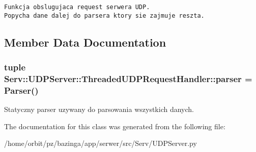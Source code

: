 \footnotesize\begin{verbatim}Funkcja obslugujaca request serwera UDP.
Popycha dane dalej do parsera ktory sie zajmuje reszta.
\end{verbatim}
\normalsize
 

\subsection{Member Data Documentation}
\hypertarget{class_serv_1_1_u_d_p_server_1_1_threaded_u_d_p_request_handler_c0a5ee1efde591fb33de85283b9b4d3f}{
\subsubsection[{parser}]{\setlength{\rightskip}{0pt plus 5cm}tuple {\bf Serv::UDPServer::ThreadedUDPRequestHandler::parser} = {\bf Parser}()}}
\label{class_serv_1_1_u_d_p_server_1_1_threaded_u_d_p_request_handler_c0a5ee1efde591fb33de85283b9b4d3f}


Statyczny parser uzywany do parsowania wszystkich danych. 



The documentation for this class was generated from the following file:\begin{CompactItemize}
\item 
/home/orbit/pz/bazinga/app/serwer/src/Serv/UDPServer.py\end{CompactItemize}
